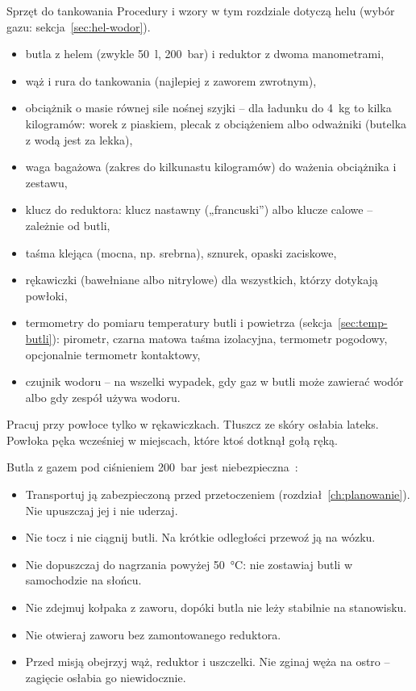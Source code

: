 \begin{sekcja}{Sprzęt do tankowania}
Procedury i wzory w tym rozdziale dotyczą helu (wybór gazu: sekcja~\ref{sec:hel-wodor}).

\begin{itemize}
  \item butla z helem (zwykle \SI{50}{l}, \SI{200}{bar}) i reduktor z dwoma manometrami,
  \item wąż i rura do tankowania (najlepiej z zaworem zwrotnym),
  \item obciążnik o masie równej sile nośnej szyjki -- dla ładunku do \SI{4}{kg} to kilka kilogramów: worek z piaskiem, plecak z obciążeniem albo odważniki (butelka z wodą jest za lekka),
  \item waga bagażowa (zakres do kilkunastu kilogramów) do ważenia obciążnika i zestawu,
  \item klucz do reduktora: klucz nastawny („francuski”) albo klucze calowe -- zależnie od butli,
  \item taśma klejąca (mocna, np. srebrna), sznurek, opaski zaciskowe,
  \item rękawiczki (bawełniane albo nitrylowe) dla wszystkich, którzy dotykają powłoki,
  \item termometry do pomiaru temperatury butli i powietrza (sekcja~\ref{sec:temp-butli}): pirometr, czarna matowa taśma izolacyjna, termometr pogodowy, opcjonalnie termometr kontaktowy,
  \item czujnik wodoru -- na wszelki wypadek, gdy gaz w butli może zawierać wodór albo gdy zespół używa wodoru.
\end{itemize}

\begin{uwaga}Pracuj przy powłoce tylko w rękawiczkach. Tłuszcz ze skóry osłabia lateks. Powłoka pęka wcześniej w miejscach, które ktoś dotknął gołą ręką.\end{uwaga}

\begin{uwaga}Butla z gazem pod ciśnieniem \SI{200}{bar} jest niebezpieczna~\cite[rozdz.~6]{nasahb}:
\begin{itemize}
  \item Transportuj ją zabezpieczoną przed przetoczeniem (rozdział~\ref{ch:planowanie}). Nie upuszczaj jej i nie uderzaj.
  \item Nie tocz i nie ciągnij butli. Na krótkie odległości przewoź ją na wózku.
  \item Nie dopuszczaj do nagrzania powyżej \SI{50}{\degreeCelsius}: nie zostawiaj butli w samochodzie na słońcu.
  \item Nie zdejmuj kołpaka z zaworu, dopóki butla nie leży stabilnie na stanowisku.
  \item Nie otwieraj zaworu bez zamontowanego reduktora.
  \item Przed misją obejrzyj wąż, reduktor i uszczelki. Nie zginaj węża na ostro -- zagięcie osłabia go niewidocznie.
\end{itemize}\end{uwaga}


\end{sekcja}
